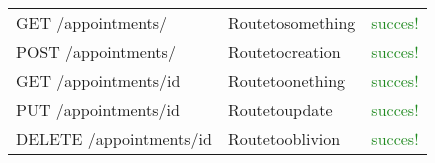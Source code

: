 \documentclass{report}
\begin{document}
\begin{table}[H]
\begin{tabularx}{\textwidth}{X X X}
GET /appointments/
&
Routetosomething
&
\textcolor{ForestGreen}{succes!}
\\

POST /appointments/
&
Routetocreation
&
\textcolor{ForestGreen}{succes!}
\\

GET /appointments/{id}
&
Routetoonething
&
\textcolor{ForestGreen}{succes!}
\\

PUT /appointments/{id}
&
Routetoupdate
&
\textcolor{ForestGreen}{succes!}
\\

DELETE /appointments/{id}
&
Routetooblivion
&
\textcolor{ForestGreen}{succes!}
\\

\hline
\end{tabularx}
\end{table}
\end{document}
